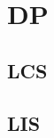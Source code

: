 %         

%         

\section{DP}
    \subsection{LCS}
        
    \subsection{LIS}
             
            
